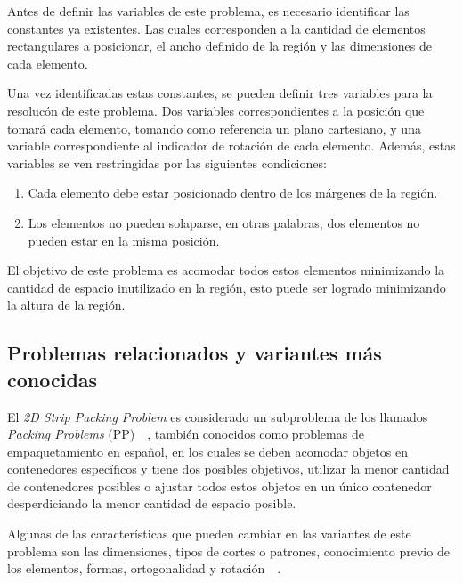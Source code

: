 \documentclass[letter, 10pt]{article}
\begin{document}
Antes de definir las variables de este problema, es necesario identificar las constantes ya existentes. Las cuales corresponden a la cantidad de elementos rectangulares a posicionar, el ancho definido de la regi\'on y las dimensiones de cada elemento.

Una vez identificadas estas constantes, se pueden definir tres variables para la resoluc\'on de este problema. Dos variables correspondientes a la posici\'on que tomar\'a cada elemento, tomando como referencia un plano cartesiano, y una variable correspondiente al indicador de rotaci\'on de cada elemento. Adem\'as, estas variables se ven restringidas por las siguientes condiciones:

\begin{enumerate}
    \item Cada elemento debe estar posicionado dentro de los m\'argenes de la regi\'on.
    \item Los elementos no pueden solaparse, en otras palabras, dos elementos no pueden estar en la misma posici\'on.
\end{enumerate}

El objetivo de este problema es acomodar todos estos elementos minimizando la cantidad de espacio inutilizado en la regi\'on, esto puede ser logrado minimizando la altura de la regi\'on.

\subsection{Problemas relacionados y variantes m\'as conocidas}

El \emph{2D Strip Packing Problem} es considerado un subproblema de los llamados \emph{Packing Problems} (PP)~\cite{babaouglu2017solving}~\cite{lodi2002two}, tambi\'en conocidos como problemas de empaquetamiento en espa\~nol, en los cuales se deben acomodar objetos en contenedores espec\'ificos y tiene dos posibles objetivos, utilizar la menor cantidad de contenedores posibles o ajustar todos estos objetos en un \'unico contenedor desperdiciando la menor cantidad de espacio posible.

Algunas de las caracter\'isticas que pueden cambiar en las variantes de este problema son las dimensiones, tipos de cortes o patrones, conocimiento previo de los elementos, formas, ortogonalidad y rotaci\'on~\cite{junior2022rectangular}~\cite{oliveira2016survey}.
\end{document}
